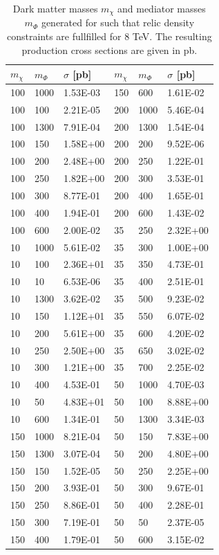 \begin{table}[h]
	\centering
	\begin{tabular}{lll|lll}
		\hline \hline
		$m_\chi $  & $m_\Phi$ & $\sigma$ [pb] & $m_\chi $  & $m_\Phi$ & $\sigma$ [pb]\\ \hline \hline
		100 & 1000 & 1.53E-03 & 150 & 600  & 1.61E-02 \\\hline
		100 & 100  & 2.21E-05 & 200 & 1000 & 5.46E-04 \\\hline
		100 & 1300 & 7.91E-04 & 200 & 1300 & 1.54E-04 \\\hline
		100 & 150  & 1.58E+00 & 200 & 200  & 9.52E-06 \\\hline
		100 & 200  & 2.48E+00 & 200 & 250  & 1.22E-01 \\\hline
		100 & 250  & 1.82E+00 & 200 & 300  & 3.53E-01 \\\hline
		100 & 300  & 8.77E-01 & 200 & 400  & 1.65E-01 \\\hline
		100 & 400  & 1.94E-01 & 200 & 600  & 1.43E-02 \\\hline
		100 & 600  & 2.00E-02 & 35  & 250  & 2.32E+00 \\\hline
		10  & 1000 & 5.61E-02 & 35  & 300  & 1.00E+00 \\\hline
		10  & 100  & 2.36E+01 & 35  & 350  & 4.73E-01 \\\hline
		10  & 10   & 6.53E-06 & 35  & 400  & 2.51E-01 \\\hline
		10  & 1300 & 3.62E-02 & 35  & 500  & 9.23E-02 \\\hline
		10  & 150  & 1.12E+01 & 35  & 550  & 6.07E-02 \\\hline
		10  & 200  & 5.61E+00 & 35  & 600  & 4.20E-02 \\\hline
		10  & 250  & 2.50E+00 & 35  & 650  & 3.02E-02 \\\hline
		10  & 300  & 1.21E+00 & 35  & 700  & 2.25E-02 \\\hline
		10  & 400  & 4.53E-01 & 50  & 1000 & 4.70E-03 \\\hline
		10  & 50   & 4.83E+01 & 50  & 100  & 8.88E+00 \\\hline
		10  & 600  & 1.34E-01 & 50  & 1300 & 3.34E-03 \\\hline
		150 & 1000 & 8.21E-04 & 50  & 150  & 7.83E+00 \\\hline
		150 & 1300 & 3.07E-04 & 50  & 200  & 4.80E+00 \\\hline
		150 & 150  & 1.52E-05 & 50  & 250  & 2.25E+00 \\\hline
		150 & 200  & 3.93E-01 & 50  & 300  & 9.67E-01 \\\hline
		150 & 250  & 8.86E-01 & 50  & 400  & 2.28E-01 \\\hline
		150 & 300  & 7.19E-01 & 50  & 50   & 2.37E-05 \\\hline
		150 & 400  & 1.79E-01 & 50  & 600  & 3.15E-02 \\\hline
		\hline
	\end{tabular}
	\caption{Dark matter masses $m_{\chi}$ and mediator masses $m_{\Phi}$ generated for such that relic density constraints are fullfilled for 8 TeV. The resulting
		production cross sections are given in pb.\label{tab:g_relic_8T}}
\end{table}



